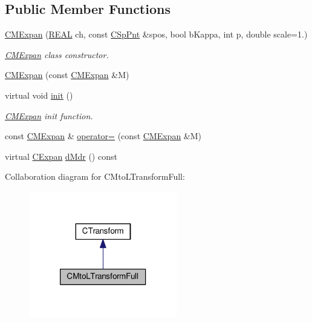 \subsection*{Public Member Functions}
\begin{DoxyCompactItemize}
\item 
\hyperlink{classCMExpan_afc2ced05f674474dee519627ca6f46ee}{C\-M\-Expan} (\hyperlink{util_8h_a5821460e95a0800cf9f24c38915cbbde}{R\-E\-A\-L} ch, const \hyperlink{classCSpPnt}{C\-Sp\-Pnt} \&spos, bool b\-Kappa, int p, double scale=1.)
\begin{DoxyCompactList}\small\item\em \hyperlink{classCMExpan}{C\-M\-Expan} class constructor. \end{DoxyCompactList}\item 
\hyperlink{classCMExpan_ab7ef3ccf42356939efa9936eff3ad2b7}{C\-M\-Expan} (const \hyperlink{classCMExpan}{C\-M\-Expan} \&M)
\item 
virtual void \hyperlink{classCMExpan_a699048991f3a09ed9b7991e33ad422d7}{init} ()
\begin{DoxyCompactList}\small\item\em \hyperlink{classCMExpan}{C\-M\-Expan} init function. \end{DoxyCompactList}\item 
const \hyperlink{classCMExpan}{C\-M\-Expan} \& \hyperlink{classCMExpan_a8c16ac85626b9bdbbe3953ca2c285158}{operator=} (const \hyperlink{classCMExpan}{C\-M\-Expan} \&M)
\item 
virtual \hyperlink{classCExpan}{C\-Expan} \hyperlink{classCMExpan_af9582edc26146339150b209b7cdd2f0e}{d\-Mdr} () const 
\end{DoxyCompactItemize}


Collaboration diagram for C\-Mto\-L\-Transform\-Full\-:\nopagebreak
\begin{figure}[H]
\begin{center}
\leavevmode
\includegraphics[width=184pt]{classCMtoLTransformFull__coll__graph}
\end{center}
\end{figure}
